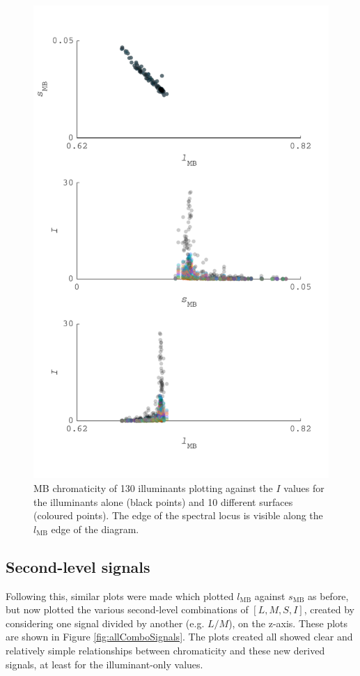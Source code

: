 \begin{figure}[htbp]
    \includegraphics[max width=\textwidth]{figs/comp/predictingChromaticity/CvsI.pdf}
    \caption{\gls{MB} chromaticity of 130 illuminants plotting against the $I$ values for the illuminants alone (black points) and 10 different surfaces (coloured points). The edge of the spectral locus is visible along the $l_{\text{MB}}$ edge of the diagram.}
    \label{fig:level1}
\end{figure} 

\subsection{Second-level signals}
Following this, similar plots were made which plotted $l_{\text{MB}}$ against $s_{\text{MB}}$ as before, but now plotted the various second-level combinations of $[L,M,S,I]$, created by considering one signal divided by another (e.g. $L/M$), on the z-axis. These plots are shown in Figure \ref{fig:allComboSignals}. The plots created all showed clear and relatively simple relationships between chromaticity and these new derived signals, at least for the illuminant-only values. 

